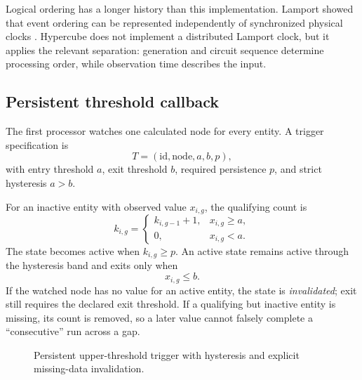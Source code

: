 \documentclass{strategynet-journal}
\begin{document}
Logical ordering has a longer history than this implementation.  Lamport
showed that event ordering can be represented independently of synchronized
physical clocks \cite{lamport}.  Hypercube does not implement a distributed
Lamport clock, but it applies the relevant separation: generation and circuit
sequence determine processing order, while observation time describes the
input.

\subsection{Persistent threshold callback}

The first processor watches one calculated node for every entity.  A trigger
specification is
\[
  T=(\mathrm{id},\mathrm{node},a,b,p),
\]
with entry threshold \(a\), exit threshold \(b\), required persistence \(p\),
and strict hysteresis \(a>b\).

For an inactive entity with observed value \(x_{i,g}\), the qualifying count is
\[
  k_{i,g}=
  \begin{cases}
    k_{i,g-1}+1,&x_{i,g}\ge a,\\
    0,&x_{i,g}<a.
  \end{cases}
\]
The state becomes active when \(k_{i,g}\ge p\).  An active state remains active
through the hysteresis band and exits only when
\[
  x_{i,g}\le b.
\]
If the watched node has no value for an active entity, the state is
\emph{invalidated}; exit still requires the declared exit threshold.  If a qualifying but inactive entity
is missing, its count is removed, so a later value cannot falsely complete a
``consecutive'' run across a gap.

\begin{figure}[H]
\centering
{}
\caption{Persistent upper-threshold trigger with hysteresis and explicit
missing-data invalidation.}
\label{fig:trigger-state}
\end{figure}
\end{document}
